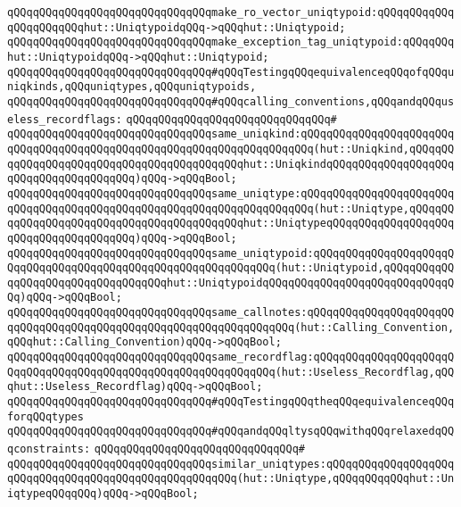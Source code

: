 \verb|qQQqqQQqqQQqqQQqqQQqqQQqqQQqqQQqmake_ro_vector_uniqtypoid:qQQqqQQqqQQqqQQqqQQqqQQqhut::UniqtypoidqQQq->qQQqhut::Uniqtypoid;|\newline
\verb|qQQqqQQqqQQqqQQqqQQqqQQqqQQqqQQqmake_exception_tag_uniqtypoid:qQQqqQQqhut::UniqtypoidqQQq->qQQqhut::Uniqtypoid;|\newline
\newline
\verb|qQQqqQQqqQQqqQQqqQQqqQQqqQQqqQQq#qQQqTestingqQQqequivalenceqQQqofqQQquniqkinds,qQQquniqtypes,qQQquniqtypoids,|\newline
\verb|qQQqqQQqqQQqqQQqqQQqqQQqqQQqqQQq#qQQqcalling_conventions,qQQqandqQQquseless_recordflags:|\newline
\verb|qQQqqQQqqQQqqQQqqQQqqQQqqQQqqQQq#|\newline
\verb|qQQqqQQqqQQqqQQqqQQqqQQqqQQqqQQqsame_uniqkind:qQQqqQQqqQQqqQQqqQQqqQQqqQQqqQQqqQQqqQQqqQQqqQQqqQQqqQQqqQQqqQQqqQQqqQQq(hut::Uniqkind,qQQqqQQqqQQqqQQqqQQqqQQqqQQqqQQqqQQqqQQqqQQqhut::UniqkindqQQqqQQqqQQqqQQqqQQqqQQqqQQqqQQqqQQqqQQq)qQQq->qQQqBool;|\newline
\verb|qQQqqQQqqQQqqQQqqQQqqQQqqQQqqQQqsame_uniqtype:qQQqqQQqqQQqqQQqqQQqqQQqqQQqqQQqqQQqqQQqqQQqqQQqqQQqqQQqqQQqqQQqqQQqqQQq(hut::Uniqtype,qQQqqQQqqQQqqQQqqQQqqQQqqQQqqQQqqQQqqQQqqQQqhut::UniqtypeqQQqqQQqqQQqqQQqqQQqqQQqqQQqqQQqqQQqqQQq)qQQq->qQQqBool;|\newline
\verb|qQQqqQQqqQQqqQQqqQQqqQQqqQQqqQQqsame_uniqtypoid:qQQqqQQqqQQqqQQqqQQqqQQqqQQqqQQqqQQqqQQqqQQqqQQqqQQqqQQqqQQqqQQq(hut::Uniqtypoid,qQQqqQQqqQQqqQQqqQQqqQQqqQQqqQQqqQQqhut::UniqtypoidqQQqqQQqqQQqqQQqqQQqqQQqqQQqqQQq)qQQq->qQQqBool;|\newline
\verb|qQQqqQQqqQQqqQQqqQQqqQQqqQQqqQQqsame_callnotes:qQQqqQQqqQQqqQQqqQQqqQQqqQQqqQQqqQQqqQQqqQQqqQQqqQQqqQQqqQQqqQQqqQQq(hut::Calling_Convention,qQQqhut::Calling_Convention)qQQq->qQQqBool;|\newline
\verb|qQQqqQQqqQQqqQQqqQQqqQQqqQQqqQQqsame_recordflag:qQQqqQQqqQQqqQQqqQQqqQQqqQQqqQQqqQQqqQQqqQQqqQQqqQQqqQQqqQQqqQQq(hut::Useless_Recordflag,qQQqhut::Useless_Recordflag)qQQq->qQQqBool;|\newline
\newline
\verb|qQQqqQQqqQQqqQQqqQQqqQQqqQQqqQQq#qQQqTestingqQQqtheqQQqequivalenceqQQqforqQQqtypes|\newline
\verb|qQQqqQQqqQQqqQQqqQQqqQQqqQQqqQQq#qQQqandqQQqltysqQQqwithqQQqrelaxedqQQqconstraints:|\newline
\verb|qQQqqQQqqQQqqQQqqQQqqQQqqQQqqQQq#|\newline
\verb|qQQqqQQqqQQqqQQqqQQqqQQqqQQqqQQqsimilar_uniqtypes:qQQqqQQqqQQqqQQqqQQqqQQqqQQqqQQqqQQqqQQqqQQqqQQqqQQqqQQq(hut::Uniqtype,qQQqqQQqqQQqhut::UniqtypeqQQqqQQq)qQQq->qQQqBool;|\newline
